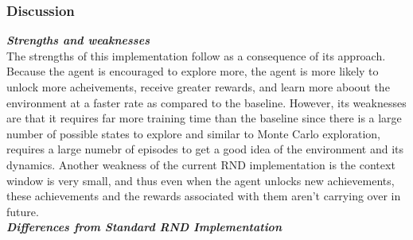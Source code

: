 \documentclass[twocolumn]{article}
\begin{document}
\subsubsection*{Discussion}
\textbf{\textit{Strengths and weaknesses}}\\
The strengths of this implementation follow as a consequence of its approach. Because the agent is encouraged to explore more, the agent is more likely to unlock more acheivements, receive greater rewards, and learn more aboout the environment at a faster rate as compared to the baseline. However, its weaknesses are that it requires far more training time than the baseline since there is a large number of possible states to explore and similar to Monte Carlo exploration, requires a large numebr of episodes to get a good idea of the environment and its dynamics. Another weakness of the current RND implementation is the context window is very small, and thus even when the agent unlocks new achievements, these achievements and the rewards associated with them aren't carrying over in future.\\
\textbf{\textit{Differences from Standard RND Implementation}}\\
\end{document}
